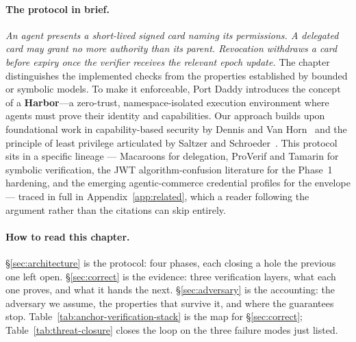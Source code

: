 \documentclass[11pt,a4paper]{article}
\theoremstyle{definition}
\begin{document}
\paragraph{The protocol in brief.} \emph{An agent presents a short-lived signed card naming its permissions. A delegated card may grant no more authority than its parent. Revocation withdraws a card before expiry once the verifier receives the relevant epoch update.} The chapter distinguishes the implemented checks from the properties established by bounded or symbolic models.
To make it enforceable, Port Daddy introduces the concept of a \textbf{Harbor}---a zero-trust, namespace-isolated execution environment where agents must prove their identity and capabilities. Our approach builds upon foundational work in capability-based security by Dennis and Van Horn~ and the principle of least privilege articulated by Saltzer and Schroeder~. This protocol sits in a specific lineage --- Macaroons for delegation, ProVerif and Tamarin for symbolic verification, the JWT algorithm-confusion literature for the Phase~1 hardening, and the emerging agentic-commerce credential profiles for the envelope --- traced in full in Appendix~\ref{app:related}, which a reader following the argument rather than the citations can skip entirely.
\paragraph{How to read this chapter.} \S\ref{sec:architecture} is the protocol: four phases, each closing a hole the previous one left open. \S\ref{sec:correct} is the evidence: three verification layers, what each one proves, and what it hands the next. \S\ref{sec:adversary} is the accounting: the adversary we assume, the properties that survive it, and where the guarantees stop. Table~\ref{tab:anchor-verification-stack} is the map for \S\ref{sec:correct}; Table~\ref{tab:threat-closure} closes the loop on the three failure modes just listed.
\vspace{4pt}
\noindent{}
\vspace{4pt}
\end{document}
